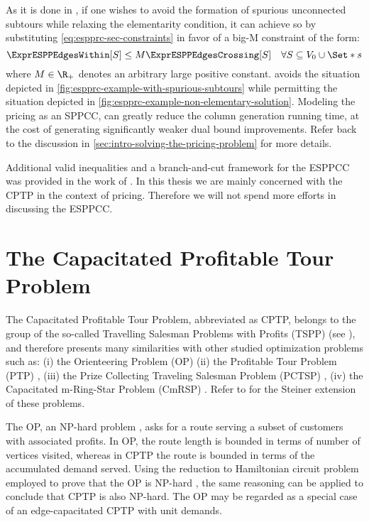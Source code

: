 As it is done in \textcite{beasley1989},
if one wishes to avoid the formation of spurious unconnected subtours
while relaxing the elementarity condition,
it can achieve so by substituting \cref{eq:espprc-sec-constraints} in favor
of a big-M constraint of the form:
\begin{equation}
	\label{eq:espprc-relaxed-elementarity}
	\ExprESPPEdgesWithin[S] \le M \ExprESPPEdgesCrossing[S] \quad \forall S \subseteq V_0 \cup \Set*{s}
\end{equation}
where $M \in \R_+$ denotes an arbitrary large positive constant.
 avoids the situation depicted
in \cref{fig:espprc-example-with-spurious-subtours}
while permitting the situation depicted in \cref{fig:espprc-example-non-elementary-solution}.
Modeling the pricing as an SPPCC, can greatly reduce
the column generation running time, at the cost
of generating significantly weaker dual bound improvements.
Refer back to the discussion in \cref{sec:intro-solving-the-pricing-problem}
for more details.

Additional valid inequalities and a branch-and-cut framework
for the ESPPCC was provided in the work of \textcite{jepsen2008branchandcut}.
In this thesis we are mainly concerned with the CPTP in the context of pricing.
Therefore we will not spend more efforts in discussing the ESPPCC.

\section{The Capacitated Profitable Tour Problem}
\label{sec:the-capacitated-profitable-tour-problem}

The Capacitated Profitable Tour Problem, abbreviated as CPTP,
belongs to the group of the so-called
Travelling Salesman Problems with Profits (TSPP) (see \cite{feillet2005}),
and therefore presents many similarities with other
studied optimization problems such as:
(i) the Orienteering Problem (OP) \parencite{golden1987, laporte1990}
(ii) the Profitable Tour Problem (PTP) \parencite{dellamico1995},
(iii) the Prize Collecting Traveling Salesman Problem (PCTSP) \parencite{balas1989prize, balas1995prize},
(iv) the Capacitated m-Ring-Star Problem (CmRSP) \parencite{baldacci2007capacitated}.
Refer to \textcite{letchford2013} for the Steiner extension of these problems.

The OP, an NP-hard problem \parencite{laporte1990}, asks for a route serving
a subset of customers with associated profits.
In OP, the route length is bounded in terms of number of vertices visited,
whereas in CPTP the route is bounded in terms of the accumulated demand served.
Using the reduction to Hamiltonian circuit problem
employed to prove that the OP is NP-hard \parencite{laporte1990},
the same reasoning can be applied to conclude that CPTP is also NP-hard.
The OP may be regarded as a special case of an edge-capacitated CPTP with unit demands.

